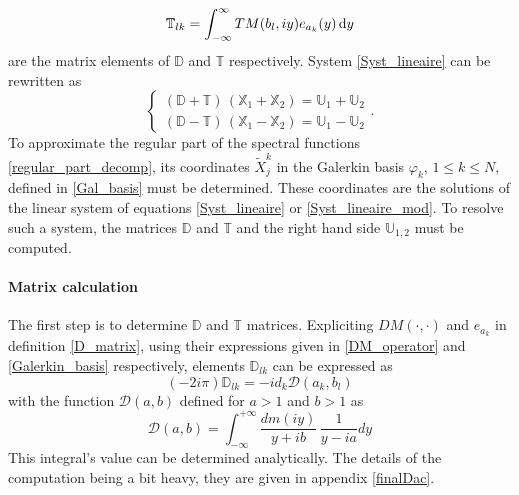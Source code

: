 \begin{equation}
\label{T_matrix}
\mathbb{T}_{lk} = \int_{-\infty}^\infty TM(b_l,iy) e_{a_k}(y) \, {\rm d} y
\end{equation}
are the matrix elements of $\mathbb{D}$ and $\mathbb{T}$ respectively. System \eqref{Syst_lineaire} can be rewritten as
\begin{equation}
\label{Syst_lineaire_mod}
\begin{cases}
(\mathbb{D} + \mathbb{T}) \, (\mathbb{X}_1 + \mathbb{X}_2) = \mathbb{U}_1 +  \mathbb{U}_2\\
(\mathbb{D} - \mathbb{T}) \, (\mathbb{X}_1 - \mathbb{X}_2) = \mathbb{U}_1 - \mathbb{U}_2
\end{cases}.
\end{equation}
To approximate the regular part of the spectral functions \eqref{regular_part_decomp}, its coordinates $\tilde{X}_j^k$ in the Galerkin basis $\varphi_k, \, 1 \leq k \leq N$, defined in \eqref{Gal_basis} must be determined. These coordinates are the solutions of the linear system of equations \eqref{Syst_lineaire} or \eqref{Syst_lineaire_mod}. To resolve such a system, the matrices $\mathbb{D}$ and $\mathbb{T}$ and the right hand side $\mathbb{U}_{1,2}$ must be computed. 

\paragraph{Matrix calculation}

The first step is to determine $\mathbb{D}$ and $\mathbb{T}$ matrices.
Expliciting $DM(\cdot,\cdot)$ and $e_{a_k}$ in definition \eqref{D_matrix}, using their expressions given in \eqref{DM_operator} and \eqref{Galerkin_basis} respectively, elements $\mathbb{D}_{lk}$ can be expressed as
\begin{equation}
\label{matrice_D}
(-2i\pi) \mathbb{D}_{lk} =  -i d_k \mathcal{D}(a_k,b_l)
\end{equation}
with the function $\mathcal{D}(a,b)$ defined for $a>1$ and $b>1$ as
\begin{equation}
\label{ldbis}
\mathcal{D}(a,b) = \int_{-\infty}^{+\infty} \dfrac{dm(iy)}{y + ib} \, \dfrac{1}{y -ia} dy 
\end{equation}
This integral's value can be determined analytically. The details of the computation being a bit heavy, they are given in appendix \ref{finalDac}.

